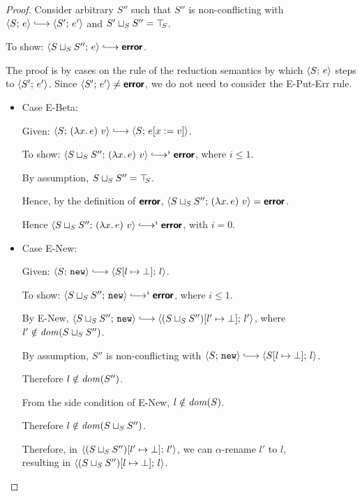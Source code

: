 \begin{proof}
  Consider arbitrary $S''$ such that $S''$ is non-conflicting with
  $\config{S}{e} \parstepsto \config{S'}{e'}$ and $S' \sqcup_{S} S''
  = \top\hspace{-0.85mm}_{S}$.

  To show: $\config{\lubstore{S}{S''}}{e} \parstepsto \error$.

  The proof is by cases on the rule of the reduction semantics by
  which $\langle S;\, e \rangle$ steps to $\langle S';\, e' \rangle$.  Since
  $\langle S';\, e' \rangle \neq \textbf{\textsf{error}}$, we do not need to consider the {\sc
    E-Put-Err} rule.
  \begin{itemize}

    \item Case {\sc E-Beta}:

      Given: $\config{S}{\app{(\lam{x}{e})}{v}} \parstepsto
      \config{S}{\subst{e}{x}{v}}$.

      To show: $\config{\lubstore{S}{S''}}{\app{(\lam{x}{e})}{v}}
      \parstepsto^i \error$, where $i \leq 1$.

      By assumption, $S \sqcup_{S} S'' = \top\hspace{-0.85mm}_{S}$.

      Hence, by the definition of $\textbf{\textsf{error}}$,
      $\langle S \sqcup_{S} S'';\, (\lambda x.\,e)~v \rangle = \textbf{\textsf{error}}$.

      Hence $\config{\lubstore{S}{S''}}{\app{(\lam{x}{e})}{v}}
      \parstepsto^i \error$, with $i = 0$.

    \item Case {\sc E-New}:

      Given: $\config{S}{\NEW} \parstepsto
      \config{\extSRaw{S}{l}{\bot}}{l}$.

      To show: $\config{\lubstore{S}{S''}}{\NEW} \parstepsto^i
      \error$, where $i \leq 1$.

      By {\sc E-New}, $\config{\lubstore{S}{S''}}{\NEW} \parstepsto
      \config{\extSRaw{(\lubstore{S}{S''})}{l'}{\bot}}{l'}$, where $l'
      \notin \mathit{dom}(S \sqcup_{S} S'')$.

      By assumption, $S''$ is non-conflicting with $\config{S}{\NEW}
      \parstepsto \config{\extSRaw{S}{l}{\bot}}{l}$.
 
      Therefore $l \notin \mathit{dom}(S'')$.

      From the side condition of {\sc E-New}, $l \notin \mathit{dom}(S)$.

      Therefore $l \notin \mathit{dom}(S \sqcup_{S} S'')$.

      Therefore, in
      $\langle (S \sqcup_{S} S'')[l' \mapsto \bot];\, l' \rangle$, we can
      $\alpha$-rename $l'$ to $l$, \\ resulting in
      $\langle (S \sqcup_{S} S'')[l \mapsto \bot];\, l \rangle$.


\end{itemize}
\end{proof}
